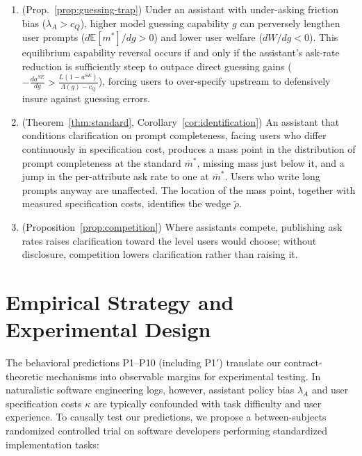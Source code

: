 \documentclass[11pt]{article}
\begin{document}
\begin{enumerate}[leftmargin=*]
\item[\textbf{P8}] (Prop.~\ref{prop:guessing-trap}) Under an assistant with under-asking friction bias ($\lambda_A > c_Q$), higher model guessing capability $g$ can perversely lengthen user prompts ($d\mathbb{E}[m^*]/dg > 0$) and lower user welfare ($dW/dg < 0$). This equilibrium capability reversal occurs if and only if the assistant's ask-rate reduction is sufficiently steep to outpace direct guessing gains ($-\frac{da^{SE}}{dg} > \frac{L(1 - a^{SE})}{\Lambda(g) - c_Q}$), forcing users to over-specify upstream to defensively insure against guessing errors.
\item[\textbf{P9}] (Theorem~\ref{thm:standard}, Corollary~\ref{cor:identification}) An assistant that conditions clarification on prompt completeness, facing users who differ continuously in specification cost, produces a mass point in the distribution of prompt completeness at the standard $\bar m^*$, missing mass just below it, and a jump in the per-attribute ask rate to one at $\bar m^*$. Users who write long prompts anyway are unaffected. The location of the mass point, together with measured specification costs, identifies the wedge $\tilde\rho$.
\item[\textbf{P10}] (Proposition~\ref{prop:competition}) Where assistants compete, publishing ask rates raises clarification toward the level users would choose; without disclosure, competition lowers clarification rather than raising it.
\end{enumerate}

\section{Empirical Strategy and Experimental Design}
\label{sec:empirical}

The behavioral predictions P1--P10 (including P1$'$) translate our contract-theoretic mechanisms into observable margins for experimental testing. In naturalistic software engineering logs, however, assistant policy bias $\lambda_A$ and user specification costs $\kappa$ are typically confounded with task difficulty and user experience. To causally test our predictions, we propose a between-subjects randomized controlled trial on software developers performing standardized implementation tasks:
\end{document}
